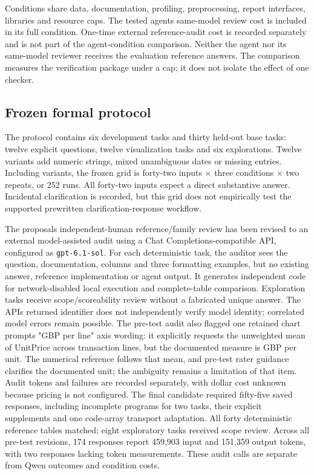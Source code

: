 Conditions share data, documentation, profiling, preprocessing, report interfaces, libraries and resource caps. The tested agent\textquotesingle s same-model review cost is included in its full condition. One-time external reference-audit cost is recorded separately and is not part of the agent-condition comparison. Neither the agent nor its same-model reviewer receives the evaluation reference answers. The comparison measures the verification package under a cap; it does not isolate the effect of one checker.

\subsection{Frozen formal protocol}\label{frozen-formal-protocol}

The protocol contains six development tasks and thirty held-out base tasks: twelve explicit questions, twelve visualization tasks and six explorations. Twelve variants add numeric strings, mixed unambiguous dates or missing entries. Including variants, the frozen grid is forty-two inputs × three conditions × two repeats, or 252 runs. All forty-two inputs expect a direct substantive answer. Incidental clarification is recorded, but this grid does not empirically test the supported prewritten clarification-response workflow.

The proposal\textquotesingle s independent-human reference/family review has been revised to an external model-assisted audit using a Chat Completions-compatible API, configured as \texttt{gpt-6.1-sol}. For each deterministic task, the auditor sees the question, documentation, columns and three formatting examples, but no existing answer, reference implementation or agent output. It generates independent code for network-disabled local execution and complete-table comparison. Exploration tasks receive scope/scoreability review without a fabricated unique answer. The API\textquotesingle s returned identifier does not independently verify model identity; correlated model errors remain possible. The pre-test audit also flagged one retained chart prompt\textquotesingle s "GBP per line" axis wording: it explicitly requests the unweighted mean of UnitPrice across transaction lines, but the documented measure is GBP per unit. The numerical reference follows that mean, and pre-test rater guidance clarifies the documented unit; the ambiguity remains a limitation of that item. Audit tokens and failures are recorded separately, with dollar cost unknown because pricing is not configured. The final candidate required fifty-five saved responses, including incomplete programs for two tasks, their explicit supplements and one code-array transport adaptation. All forty deterministic reference tables matched; eight exploratory tasks received scope review. Across all pre-test revisions, 174 responses report 459,903 input and 151,359 output tokens, with two responses lacking token measurements. These audit calls are separate from Qwen outcomes and condition costs.

